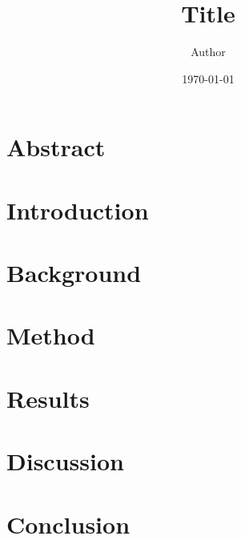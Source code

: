 \documentclass[a4paper]{article}
\title{Title}
\author{Author}
\date{\today}
\begin{document}
\maketitle
\clearpage

\section*{Abstract}      %
\clearpage

\tableofcontents         %
\clearpage

\section{Introduction}
\section{Background}     %
\section{Method}
\section{Results}
\section{Discussion}
\section{Conclusion}

\clearpage


\appendix                %
\end{document}
